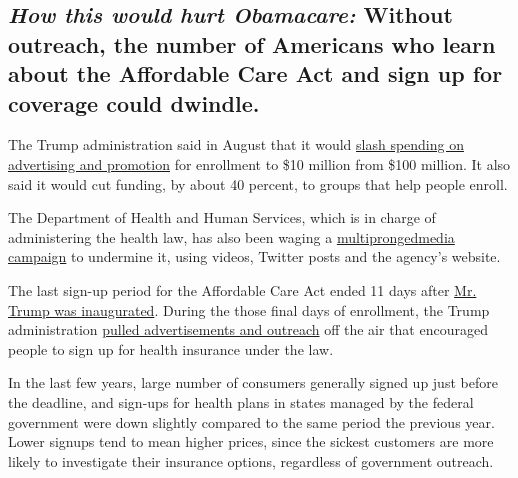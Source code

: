 \hypertarget{how-this-would-hurt-obamacare-without-outreach-the-number-of-americans-who-learn-about-the-affordable-care-act-and-sign-up-for-coverage-could-dwindle}{%
\subsection{\texorpdfstring{\emph{How this would hurt Obamacare:}
Without outreach, the number of Americans who learn about the Affordable
Care Act and sign up for coverage could
dwindle.}{How this would hurt Obamacare: Without outreach, the number of Americans who learn about the Affordable Care Act and sign up for coverage could dwindle.}}\label{how-this-would-hurt-obamacare-without-outreach-the-number-of-americans-who-learn-about-the-affordable-care-act-and-sign-up-for-coverage-could-dwindle}}

The Trump administration said in August that it would
\href{https://www.nytimes3xbfgragh.onion/2017/08/31/health/affordable-care-act-trump-spending.html}{slash
spending on advertising and promotion} for enrollment to \$10 million
from \$100 million. It also said it would cut funding, by about 40
percent, to groups that help people enroll.

The Department of Health and Human Services, which is in charge of
administering the health law, has also been waging a
\href{https://www.nytimes3xbfgragh.onion/interactive/2017/09/04/us/hhs-anti-obamacare-campaign.html?mcubz=0}{multipronged}\href{https://www.nytimes3xbfgragh.onion/interactive/2017/09/04/us/hhs-anti-obamacare-campaign.html?mcubz=0}{media
campaign} to undermine it, using videos, Twitter posts and the agency's
website.

The last sign-up period for the Affordable Care Act ended 11 days after
\href{https://www.nytimes3xbfgragh.onion/2017/01/20/us/politics/trump-inauguration-day.html}{Mr.
Trump was inaugurated}. During the those final days of enrollment, the
Trump administration
\href{https://www.nytimes3xbfgragh.onion/2017/01/26/us/politics/donald-trump-obamacare-ads.html?rref=collection\%2Fbyline\%2Frobert-pear\&action=click\&contentCollection=undefined\&region=stream\&module=stream_unit\&version=latest\&contentPlacement=5\&pgtype=collection}{pulled
advertisements and outreach} off the air that encouraged people to sign
up for health insurance under the law.

In the last few years, large number of consumers generally signed up
just before the deadline, and sign-ups for health plans in states
managed by the federal government were down slightly compared to the
same period the previous year. Lower signups tend to mean higher prices,
since the sickest customers are more likely to investigate their
insurance options, regardless of government outreach.

